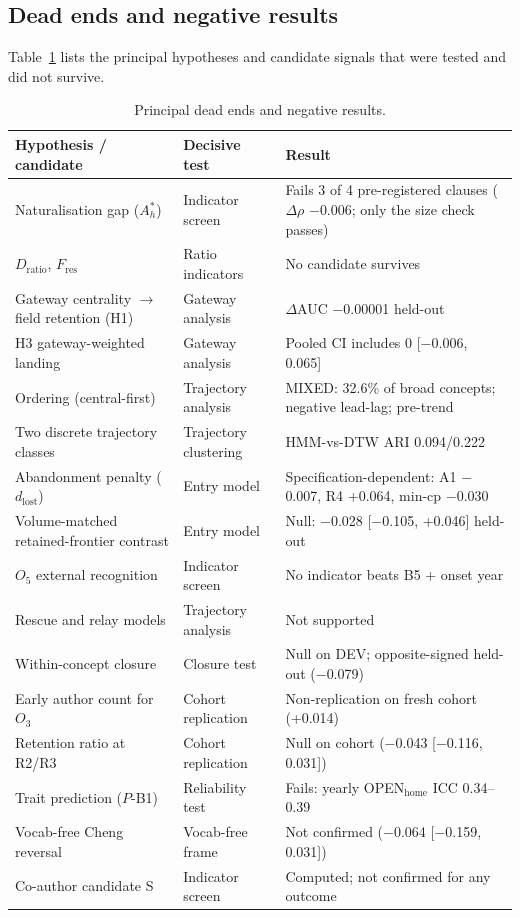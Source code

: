 \documentclass[11pt,letterpaper]{article}
\begin{document}
\subsection{Dead ends and negative results}
\label{sec:dead_ends}

Table~\ref{tab:deadends} lists the principal hypotheses and candidate signals that were tested and did not survive.

\begin{table}[!htbp]
\centering
\caption{Principal dead ends and negative results.}
\label{tab:deadends}
\small
\begin{tabular}{p{4.2cm}p{2.5cm}p{5.5cm}}
\toprule
Hypothesis / candidate & Decisive test & Result \\
\midrule
Naturalisation gap ($A^*_h$) & Indicator screen & Fails 3 of 4 pre-registered clauses ($\Delta\rho$ $-$0.006; only the size check passes) \\
$D_{\text{ratio}}$, $F_{\text{res}}$ & Ratio indicators & No candidate survives \\
Gateway centrality $\rightarrow$ field retention (H1) & Gateway analysis & $\Delta$AUC $-$0.00001 held-out \\
H3 gateway-weighted landing & Gateway analysis & Pooled CI includes 0 [$-$0.006, 0.065] \\
Ordering (central-first) & Trajectory analysis & MIXED: 32.6\% of broad concepts; negative lead-lag; pre-trend \\
Two discrete trajectory classes & Trajectory clustering & HMM-vs-DTW ARI 0.094/0.222 \\
Abandonment penalty ($d_{\text{lost}}$) & Entry model & Specification-dependent: A1 $-$0.007, R4 +0.064, min-cp $-$0.030 \\
Volume-matched retained-frontier contrast & Entry model & Null: $-$0.028 [$-$0.105, +0.046] held-out \\
$O_5$ external recognition & Indicator screen & No indicator beats B5 + onset year \\
Rescue and relay models & Trajectory analysis & Not supported \\
Within-concept closure & Closure test & Null on DEV; opposite-signed held-out ($-$0.079) \\
Early author count for $O_3$ & Cohort replication & Non-replication on fresh cohort (+0.014) \\
Retention ratio at R2/R3 & Cohort replication & Null on cohort ($-$0.043 [$-$0.116, 0.031]) \\
Trait prediction ($P$-B1) & Reliability test & Fails: yearly OPEN$_{\text{home}}$ ICC 0.34--0.39 \\
Vocab-free Cheng reversal & Vocab-free frame & Not confirmed ($-$0.064 [$-$0.159, 0.031]) \\
Co-author candidate S & Indicator screen & Computed; not confirmed for any outcome \\
\bottomrule
\end{tabular}
\end{table}
\end{document}
